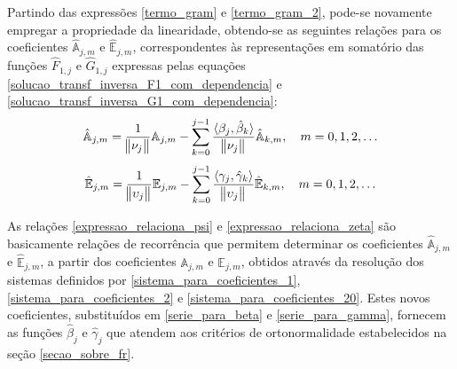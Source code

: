 Partindo das expressões \eqref{termo_gram} e \eqref{termo_gram_2}, pode-se novamente empregar a propriedade da linearidade, obtendo-se as seguintes relações para os coeficientes $\hat{\mathbb{A}}_{j,m}$ e $\hat{\mathbb{E}}_{j,m}$, correspondentes às representações em somatório das funções $\hat{F}_{1,j}$ e $\hat{G}_{1,j}$ expressas pelas equações \eqref{solucao_transf_inversa_F1_com_dependencia} e \eqref{solucao_transf_inversa_G1_com_dependencia}:
\begin{align}
\hat{\mathbb{A}}_{j,m} = \frac{1}{\norm{\nu_j}} \mathbb{A}_{j,m} - \sum_{k=0}^{j-1} \frac{\langle \beta_j, \hat{\beta}_k \rangle}{\norm{\nu_j}} \hat{\mathbb{A}}_{k,m}, \quad m=0,1,2,\ldots
\label{expressao_relaciona_psi}
\end{align}
\begin{align}
\hat{\mathbb{E}}_{j,m} = \frac{1}{\norm{\upsilon_j}} \mathbb{E}_{j,m} - \sum_{k=0}^{j-1} \frac{\langle \gamma_j, \hat{\gamma}_k \rangle}{\norm{\upsilon_j}} \hat{\mathbb{E}}_{k,m}, \quad m=0,1,2,\ldots
\label{expressao_relaciona_zeta}
\end{align}

As relações \eqref{expressao_relaciona_psi} e \eqref{expressao_relaciona_zeta} são basicamente relações de recorrência que permitem determinar os coeficientes $\hat{\mathbb{A}}_{j,m}$ e $\hat{\mathbb{E}}_{j,m}$, a partir dos coeficientes $\mathbb{A}_{j,m}$ e $\mathbb{E}_{j,m}$, obtidos através da resolução dos sistemas definidos por \eqref{sistema_para_coeficientes_1}, \eqref{sistema_para_coeficientes_2} e \eqref{sistema_para_coeficientes_20}. Estes novos coeficientes, substituídos em \eqref{serie_para_beta} e \eqref{serie_para_gamma}, fornecem as funções $\hat{\beta}_j$ e $\hat{\gamma}_j$ que atendem aos critérios de ortonormalidade estabelecidos na seção \ref{secao_sobre_fr}.

